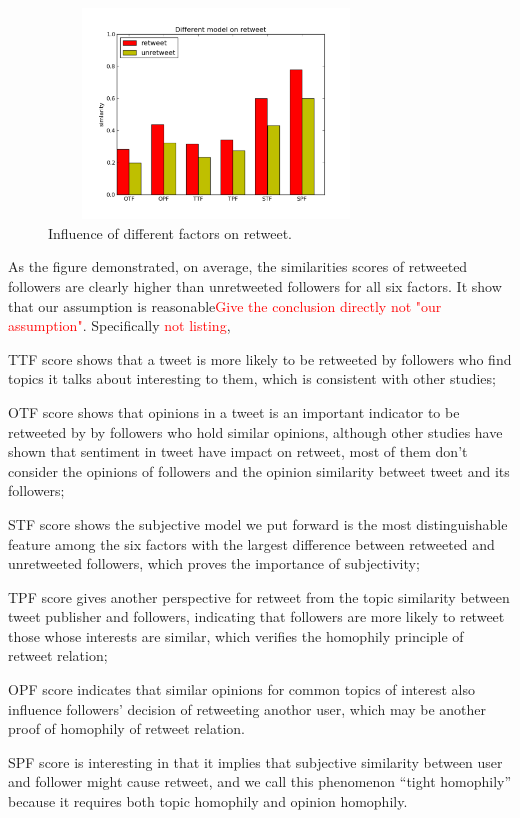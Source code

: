 \documentclass{acm_proc_article-sp}
\newcommand{\mo}[1]{\textcolor{red}{#1}}
\begin{document}
\begin{figure}[htb]
\centering
\includegraphics[width=3.5in,height=2.2in]{component.pdf}
\caption{Influence of different factors on retweet.}
\label{fig:graph6}
\end{figure}

As the figure demonstrated, on average, the similarities scores of retweeted followers are clearly higher than unretweeted followers for all six factors. It show that our assumption is reasonable\mo{Give the conclusion directly not "our assumption"}. Specifically \mo{not listing},

\begin{itemize*}
\item TTF score shows that a tweet is more likely to be retweeted by followers who find topics it talks about interesting to them, which is consistent with other studies\cite{conf/icwsm/MacskassyM11, conf/wsdm/FengW13};
\item OTF score shows that opinions in a tweet is an important indicator to be retweeted by by followers who hold similar opinions, although other studies\cite{conf/icwsm/PfitznerGS12,2011:NaveedGKC} have shown that sentiment in tweet have impact on retweet, most of them don't consider the opinions of followers and the opinion similarity betweet tweet and its followers;
\item STF score shows the subjective model we put forward is the most distinguishable feature among the six factors with the largest difference between retweeted and unretweeted followers, which proves the importance of subjectivity;
\item TPF score gives another perspective for retweet from the topic similarity between tweet publisher and followers, indicating that followers are more likely to retweet those whose interests are similar, which verifies the homophily principle of retweet relation;
\item OPF score indicates that similar opinions for common topics of interest also influence followers' decision of retweeting anothor user, which may be another proof of homophily of retweet relation.
\item SPF score is interesting in that it implies that subjective similarity between user and follower might cause retweet, and we call this phenomenon ``tight homophily'' because it requires both topic homophily and opinion homophily.
\end{itemize*} 
\end{document}
